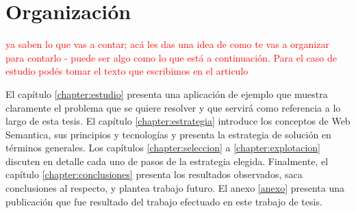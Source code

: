 \section{Organización}
\label{section:organizacion}

\begin{framed}
\textcolor{red}{ya saben lo que vas a contar; acá les das una idea de como te vas a organizar para contarlo - puede ser algo como lo que está a continuación. Para el caso de estudio podés tomar el texto que escribimos en el articulo}
\end{framed}

El capítulo \ref{chapter:estudio} presenta una aplicación de ejemplo que muestra claramente el problema que se quiere resolver y que servirá como referencia a lo largo de esta tesis. El capítulo \ref{chapter:estrategia} introduce los conceptos de Web Semantica, sus principios y tecnologías y presenta la estrategia de solución en términos generales. Los capítulos \ref{chapter:seleccion} a \ref{chapter:explotacion} discuten en detalle cada uno de pasos de la estrategia elegida. Finalmente, el capítulo \ref{chapter:conclusiones} presenta los resultados observados, saca conclusiones al respecto, y plantea trabajo futuro. El anexo \ref{anexo} presenta una publicación que fue resultado del trabajo efectuado en este trabajo de tesis. 




